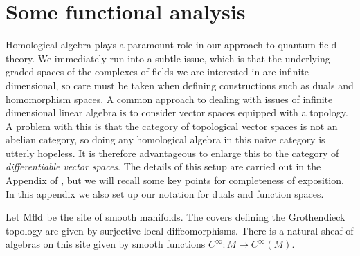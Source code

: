 \documentclass[10pt]{amsart}
\begin{document}





\appendix

\section{Some functional analysis}

Homological algebra plays a paramount role in our approach to quantum field theory.
We immediately run into a subtle issue, which is that the underlying graded spaces of the complexes of fields we are interested in are infinite dimensional, so care must be taken when defining constructions such as duals and homomorphism spaces. 
A common approach to dealing with issues of infinite dimensional linear algebra is to consider vector spaces equipped with a topology. 
A problem with this is that the category of topological vector spaces is not an abelian category, so doing any homological algebra in this naive category is utterly hopeless. 
It is therefore advantageous to enlarge this to the category of {\em differentiable vector spaces}.
The details of this setup are carried out in the Appendix of \cite{CG1}, but we will recall some key points for completeness of exposition.
In this appendix we also set up our notation for duals and function spaces. 

Let ${\rm Mfld}$ be the site of smooth manifolds.
The covers defining the Grothendieck topology are given by surjective local diffeomorphisms.
There is a natural sheaf of algebras on this site given by smooth functions $C^\infty : M \mapsto C^\infty(M)$. 
\end{document}

